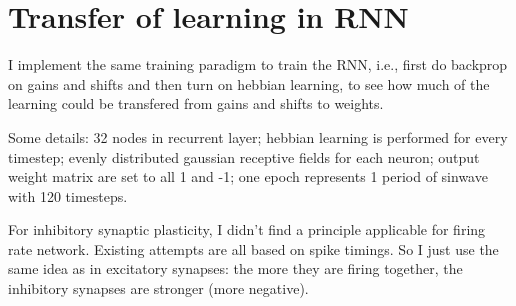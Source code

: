 \documentclass[12pt, a4paper]{article}
\begin{document}
\newpage

\section*{Transfer of learning in RNN}

I implement the same training paradigm to train the RNN, i.e., first do backprop on gains and shifts and then turn on hebbian learning, to see how much of the learning could be transfered from gains and shifts to weights.

Some details: 32 nodes in recurrent layer; hebbian learning is performed for every timestep; evenly distributed gaussian receptive fields for each neuron; output weight matrix are set to all 1 and -1; one epoch represents 1 period of sinwave with 120 timesteps.

For inhibitory synaptic plasticity, I didn't find a principle applicable for firing rate network. Existing attempts are all based on spike timings. So I just use the same idea as in excitatory synapses: the more they are firing together, the inhibitory synapses are stronger (more negative).
\end{document}

